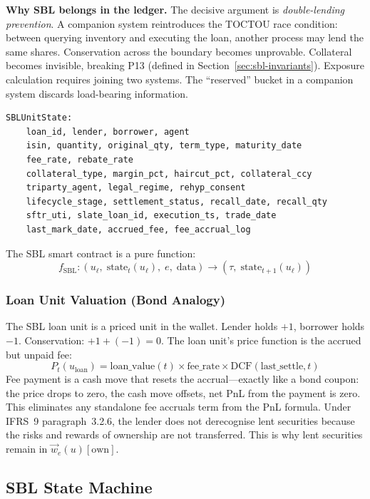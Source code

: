 \documentclass[11pt,a4paper]{article}
\begin{document}
\noindent\textbf{Why SBL belongs in the ledger.} The decisive argument is \emph{double-lending prevention}. A companion system reintroduces the TOCTOU race condition: between querying inventory and executing the loan, another process may lend the same shares. Conservation across the boundary becomes unprovable. Collateral becomes invisible, breaking P13 (defined in Section~\ref{sec:sbl-invariants}). Exposure calculation requires joining two systems. The ``reserved'' bucket in a companion system discards load-bearing information.

\begin{lstlisting}
SBLUnitState:
    loan_id, lender, borrower, agent
    isin, quantity, original_qty, term_type, maturity_date
    fee_rate, rebate_rate
    collateral_type, margin_pct, haircut_pct, collateral_ccy
    triparty_agent, legal_regime, rehyp_consent
    lifecycle_stage, settlement_status, recall_date, recall_qty
    sftr_uti, slate_loan_id, execution_ts, trade_date
    last_mark_date, accrued_fee, fee_accrual_log
\end{lstlisting}

The SBL smart contract is a pure function:
\[
f_{\mathrm{SBL}} : (u_\ell,\; \mathrm{state}_t(u_\ell),\; e,\; \mathrm{data}) \to (\tau,\; \mathrm{state}_{t+1}(u_\ell))
\]

\subsubsection{Loan Unit Valuation (Bond Analogy)}

The SBL loan unit is a priced unit in the wallet. Lender holds $+1$, borrower holds $-1$. Conservation: $+1 + (-1) = 0$. The loan unit's price function is the accrued but unpaid fee:
\[
P_t(u_{\mathrm{loan}}) = \mathrm{loan\_value}(t) \times \mathrm{fee\_rate} \times \mathrm{DCF}(\mathrm{last\_settle}, t)
\]
Fee payment is a cash move that resets the accrual---exactly like a bond coupon: the price drops to zero, the cash move offsets, net PnL from the payment is zero. This eliminates any standalone fee accruals term from the PnL formula. Under IFRS~9 paragraph~3.2.6, the lender does not derecognise lent securities because the risks and rewards of ownership are not transferred. This is why lent securities remain in $\vec{w}_e(u)[\mathrm{own}]$.

\subsection{SBL State Machine}
\label{sec:sbl-state-machine}
\end{document}
